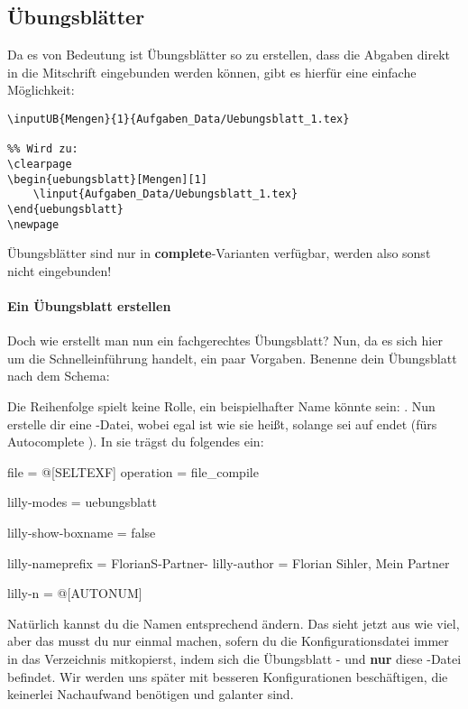 \subsection{Übungsblätter}
Da es von Bedeutung ist Übungsblätter so zu erstellen, dass die Abgaben direkt in die Mitschrift eingebunden werden können, gibt es hierfür eine einfache Möglichkeit:
\begin{lstlisting}[language=lLatex]
%% \inputUB{<Name>}{<Nummer>}{<Pfad - linput>}
\inputUB{Mengen}{1}{Aufgaben_Data/Uebungsblatt_1.tex}

%% Wird zu:
\clearpage
\begin{uebungsblatt}[Mengen][1]
    \linput{Aufgaben_Data/Uebungsblatt_1.tex}
\end{uebungsblatt}
\newpage
\end{lstlisting}
Übungsblätter sind nur in \textbf{complete}-Varianten verfügbar, werden also sonst nicht eingebunden! \paragraph{Ein Übungsblatt erstellen}
Doch wie erstellt man nun ein fachgerechtes Übungsblatt? Nun, da es sich hier um die Schnelleinführung handelt, ein paar Vorgaben. Benenne dein Übungsblatt nach dem Schema: \begin{center}
\end{center}
Die Reihenfolge spielt keine Rolle, ein beispielhafter Name könnte sein: \newline{}. Nun erstelle dir eine -Datei, wobei egal ist wie sie heißt, solange sei auf  endet (fürs Autocomplete \Smiley). In sie trägst du folgendes ein:
\begin{gepard}
file        = @[SELTEXF]
operation   = file_compile

lilly-modes = uebungsblatt

lilly-show-boxname = false

lilly-nameprefix = FlorianS-Partner-
lilly-author = Florian Sihler, Mein Partner

lilly-n = @[AUTONUM]
\end{gepard}
Natürlich kannst du die Namen entsprechend ändern. Das sieht jetzt aus wie viel, aber das musst du nur einmal machen, sofern du die Konfigurationsdatei immer in das Verzeichnis mitkopierst, indem sich die Übungsblatt - und \textbf{nur} diese -Datei befindet. Wir werden uns später %
mit besseren Konfigurationen beschäftigen, die keinerlei Nachaufwand benötigen und galanter sind.
